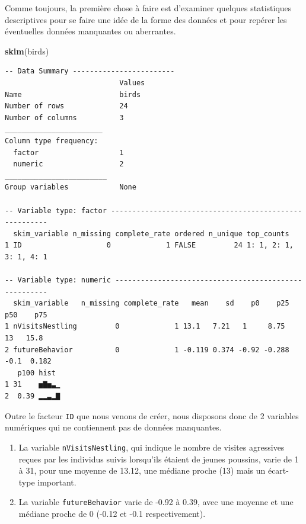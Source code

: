 \documentclass[
  a4paper,
]{article}
\newenvironment{Shaded}{\begin{snugshade}}{\end{snugshade}}
\newcommand{\KeywordTok}[1]{\textcolor[rgb]{0.12,0.11,0.11}{\textbf{#1}}}
\newcommand{\NormalTok}[1]{\textcolor[rgb]{0.12,0.11,0.11}{#1}}
\providecommand{\tightlist}{%
  \setlength{\itemsep}{0pt}\setlength{\parskip}{0pt}}
\begin{document}
Comme toujours, la première chose à faire est d'examiner quelques statistiques descriptives pour se faire une idée de la forme des données et pour repérer les éventuelles données manquantes ou aberrantes.

\begin{Shaded}
\begin{Highlighting}[]
\KeywordTok{skim}\NormalTok{(birds)}
\end{Highlighting}
\end{Shaded}

\begin{verbatim}
-- Data Summary ------------------------
                           Values
Name                       birds 
Number of rows             24    
Number of columns          3     
_______________________          
Column type frequency:           
  factor                   1     
  numeric                  2     
________________________         
Group variables            None  

-- Variable type: factor -------------------------------------------------------
  skim_variable n_missing complete_rate ordered n_unique top_counts            
1 ID                    0             1 FALSE         24 1: 1, 2: 1, 3: 1, 4: 1

-- Variable type: numeric ------------------------------------------------------
  skim_variable   n_missing complete_rate   mean    sd    p0    p25   p50    p75
1 nVisitsNestling         0             1 13.1   7.21   1     8.75   13   15.8  
2 futureBehavior          0             1 -0.119 0.374 -0.92 -0.288  -0.1  0.182
   p100 hist 
1 31    ▅▇▅▃▁
2  0.39 ▂▂▃▂▇
\end{verbatim}

Outre le facteur \texttt{ID} que nous venons de créer, nous disposons donc de 2 variables numériques qui ne contiennent pas de données manquantes.

\begin{enumerate}
\def\labelenumi{\arabic{enumi}.}
\tightlist
\item
  La variable \texttt{nVisitsNestling}, qui indique le nombre de visites agressives reçues par les individus suivis lorsqu'ils étaient de jeunes poussins, varie de 1 à 31, pour une moyenne de 13.12, une médiane proche (13) mais un écart-type important.
\item
  La variable \texttt{futureBehavior} varie de -0.92 à 0.39, avec une moyenne et une médiane proche de 0 (-0.12 et -0.1 respectivement).
\end{enumerate}
\end{document}
